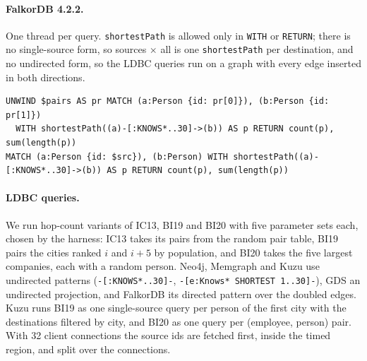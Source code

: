 \paragraph{FalkorDB 4.2.2.} One thread per query. \texttt{shortestPath} is allowed only in \texttt{WITH} or
\texttt{RETURN}; there is no single-source form, so sources $\times$ all is one \texttt{shortestPath} per destination,
and no undirected form, so the LDBC queries run on a graph with every edge inserted in both directions.
\begin{lstlisting}
UNWIND $pairs AS pr MATCH (a:Person {id: pr[0]}), (b:Person {id: pr[1]})
  WITH shortestPath((a)-[:KNOWS*..30]->(b)) AS p RETURN count(p), sum(length(p))
MATCH (a:Person {id: $src}), (b:Person) WITH shortestPath((a)-[:KNOWS*..30]->(b)) AS p RETURN count(p), sum(length(p))
\end{lstlisting}

\paragraph{LDBC queries.} We run hop-count variants of IC13, BI19 and BI20 with five parameter sets each, chosen by the
harness: IC13 takes its pairs from the random pair table, BI19 pairs the cities ranked $i$ and $i+5$ by population,
and BI20 takes the five largest companies, each with a random person. Neo4j, Memgraph and Kuzu use undirected patterns
(\texttt{-[:KNOWS*..30]-}, \texttt{-[e:Knows* SHORTEST 1..30]-}), GDS an undirected projection, and FalkorDB its
directed pattern over the doubled edges. Kuzu runs BI19 as one single-source query per person of the first city with
the destinations filtered by city, and BI20 as one query per (employee, person) pair. With 32 client connections the
source ids are fetched first, inside the timed region, and split over the connections.

